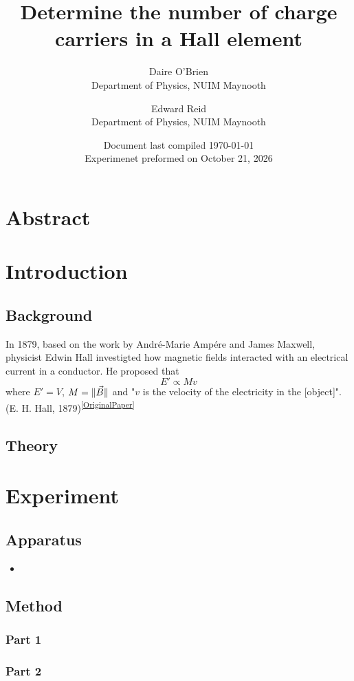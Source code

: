 \documentclass{article}[12pt]
\title{Determine the number of charge carriers in a Hall element}
\author{Daire O'Brien \\ Department of Physics, NUIM Maynooth \and Edward Reid \\ Department of Physics, NUIM Maynooth}
\date{Document last compiled \today \\
Experimenet preformed on October 21, 2026}
\newcommand{\reference}[3]{(#2, #3)\textsuperscript{\ref{#1}}} %
\DeclarePairedDelimiter{\abs}{\lVert}{\rVert}
\begin{document}
    \maketitle
    \section*{Abstract}
    \section{Introduction}
        \subsection{Background}
            In 1879, based on the work by André-Marie Ampére and James Maxwell, physicist Edwin Hall investigted how magnetic fields interacted with an electrical current in a conductor. He proposed that 
                \[E' \propto Mv\]
            where $E' = V$, $M = \abs{\vec B}$ and "$v$ is the velocity of the electricity in the [object]". \reference{OriginalPaper}{E. H. Hall}{1879}

        \subsection{Theory}
            

    \section{Experiment}
        \subsection{Apparatus}
            \begin{itemize}
                \item
            \end{itemize}

        \subsection{Method}

            \subsubsection{Part 1}


            \subsubsection{Part 2}
\end{document}
